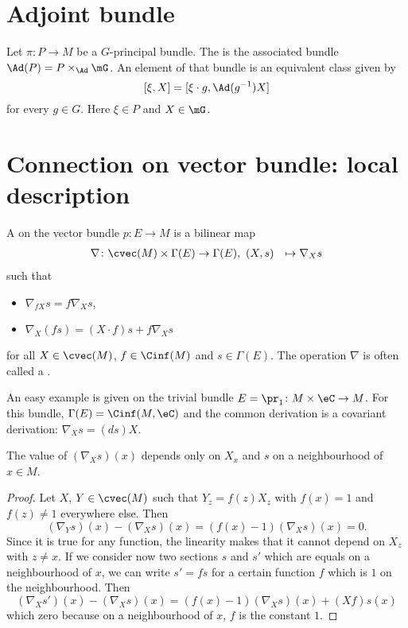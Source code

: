 \section{Adjoint bundle}

Let $\pi\colon P\to M$ be a $G$-principal bundle. The  is the associated bundle $\Ad(P)=P\times_{\Ad}\mG$. An element of that bundle is an equivalent class given by
\[ 
  [\xi,X]=[\xi\cdot g,\Ad(g^{-1})X]
\]
for every $g\in G$. Here $\xi\in P$ and $X\in\mG$.

\section{Connection on vector bundle: local description}\label{sec:conn_vect}

A  on the vector bundle $p\colon E\to M$ is a bilinear map
		\begin{equation}
		\begin{aligned}
			\nabla \colon \cvec(M)\times\Gamma(E) &\to \Gamma(E),\
			(X,s)&\mapsto \nabla_Xs
		\end{aligned}
	\end{equation}	
 such that 
 \begin{itemize}
 \item $\nabla_{fX}s=f\nabla_Xs$,
 \item $\nabla_X(fs)=(X\cdot f)s+f\nabla_Xs$
 \end{itemize}
for all $X\in\cvec(M)$, $f\in\Cinf(M)$ and $s\in\Gamma(E)$. The operation $\nabla$ is often called a .

An easy example is given on the trivial bundle $E=\pr_1\colon M\times\eC\to M$. For this bundle, $\Gamma(E)=\Cinf(M,\eC)$ and the common derivation is a covariant derivation: $\nabla_Xs=(ds)X$.

\begin{proposition}
The value of $(\nabla_Xs)(x)$ depends only on $X_x$ and $s$ on a neighbourhood of $x\in M$.
\end{proposition}

\begin{proof}
Let $X$, $Y\in\cvec(M)$ such that $Y_z=f(z)X_z$  with $f(x)=1$ and $f(z)\neq 1$ everywhere else. Then
\[
  (\nabla_Ys)(x)-(\nabla_Xs)(x)=(f(x)-1)(\nabla_Xs)(x)=0.
\]
Since it is true for any function, the linearity makes that it cannot depend on $X_z$ with $z\neq x$. If we consider now two sections $s$ and $s'$ which are equals on a neighbourhood of $x$, we can write $s'=fs$ for a certain function $f$ which is $1$ on the neighbourhood. Then
\[
  (\nabla_Xs')(x)-(\nabla_Xs)(x)=(f(x)-1)(\nabla_Xs)(x)+(Xf)s(x)
\]
which zero because on a neighbourhood of $x$, $f$ is the constant $1$.
\end{proof}

